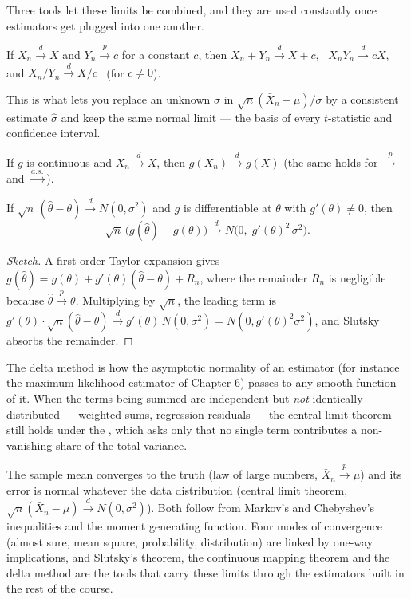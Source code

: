 \documentclass[11pt]{article}
\begin{document}
Three tools let these limits be combined, and they are used constantly once
estimators get plugged into one another.

\begin{theorem}[Slutsky]
If $X_n \xrightarrow{d} X$ and $Y_n \xrightarrow{p} c$ for a constant $c$,
then $X_n + Y_n \xrightarrow{d} X + c$, \ $X_n Y_n \xrightarrow{d} cX$, and
$X_n / Y_n \xrightarrow{d} X/c$ \ (for $c \ne 0$).
\end{theorem}

This is what lets you replace an unknown $\sigma$ in
$\sqrt n(\bar X_n - \mu)/\sigma$ by a consistent estimate $\hat\sigma$ and
keep the same normal limit --- the basis of every $t$-statistic and
confidence interval.

\begin{theorem}
If $g$ is continuous and $X_n \xrightarrow{d} X$, then
$g(X_n) \xrightarrow{d} g(X)$ (the same holds for $\xrightarrow{p}$ and
$\xrightarrow{a.s.}$).
\end{theorem}

\begin{theorem}
If $\sqrt n\,(\hat\theta - \theta) \xrightarrow{d} N(0,\sigma^2)$ and $g$ is
differentiable at $\theta$ with $g'(\theta) \ne 0$, then
\[
  \sqrt n\,\big(g(\hat\theta) - g(\theta)\big)
    \xrightarrow{d} N\!\big(0,\; g'(\theta)^2\,\sigma^2\big).
\]
\end{theorem}
\begin{proof}[Sketch]
A first-order Taylor expansion gives
$g(\hat\theta) = g(\theta) + g'(\theta)(\hat\theta - \theta) + R_n$, where the
remainder $R_n$ is negligible because $\hat\theta \xrightarrow{p} \theta$.
Multiplying by $\sqrt n$, the leading term is
$g'(\theta)\cdot\sqrt n(\hat\theta-\theta) \xrightarrow{d} g'(\theta)\,N(0,\sigma^2)
= N(0, g'(\theta)^2\sigma^2)$, and Slutsky absorbs the remainder.
\end{proof}

\noindent The delta method is how the asymptotic normality of an estimator
(for instance the maximum-likelihood estimator of Chapter 6) passes to any
smooth function of it. When the terms being summed are independent but
\emph{not} identically distributed --- weighted sums, regression residuals ---
the central limit theorem still holds under the ,
which asks only that no single term contributes a non-vanishing share of the
total variance.

\begin{summarybox}
The sample mean converges to the truth (law of large numbers,
$\bar X_n \xrightarrow{p} \mu$) and its error is normal whatever the data
distribution (central limit theorem,
$\sqrt n(\bar X_n - \mu)\xrightarrow{d} N(0,\sigma^2)$). Both follow from
Markov's and Chebyshev's inequalities and the moment generating function.
Four modes of convergence (almost sure, mean square, probability,
distribution) are linked by one-way implications, and Slutsky's theorem, the
continuous mapping theorem and the delta method are the tools that carry
these limits through the estimators built in the rest of the course.
\end{summarybox}
\end{document}
